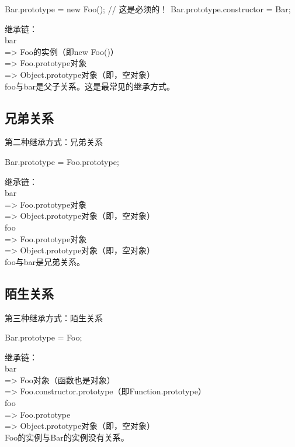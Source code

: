 \documentclass[a4paper,11pt]{article}
\begin{document}
\begin{javascriptcode}
  Bar.prototype = new Foo();
  // 这是必须的！
  Bar.prototype.constructor = Bar;
\end{javascriptcode}

继承链：\\
bar\\
=> Foo的实例（即new Foo()）\\
=> Foo.prototype对象\\
=> Object.prototype对象（即{}，空对象）\\
foo与bar是父子关系。这是最常见的继承方式。

\subsection[兄弟关系]{兄弟关系}
第二种继承方式：兄弟关系

\begin{javascriptcode}
  Bar.prototype = Foo.prototype;
\end{javascriptcode}

继承链：\\
bar\\
=> Foo.prototype对象\\
=> Object.prototype对象（即{}，空对象）\\
foo\\
=> Foo.prototype对象\\
=> Object.prototype对象（即{}，空对象）\\
foo与bar是兄弟关系。

\subsection[陌生关系]{陌生关系}
第三种继承方式：陌生关系

\begin{javascriptcode}
  Bar.prototype = Foo;
\end{javascriptcode}

继承链：\\
bar\\
=> Foo对象（函数也是对象）\\
=> Foo.constructor.prototype（即Function.prototype）\\
foo\\
=> Foo.prototype\\
=> Object.prototype对象（即{}，空对象）\\
Foo的实例与Bar的实例没有关系。
\end{document}

